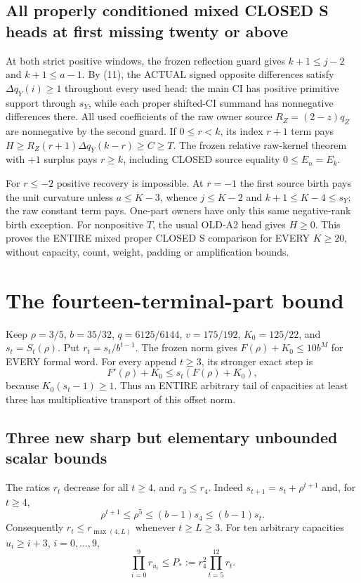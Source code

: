 \documentclass[11pt]{article}
\begin{document}
\subsection{All properly conditioned mixed CLOSED S heads at first missing twenty or above}
At both strict positive windows, the frozen reflection guard gives
$k+1\le j-2$ and $k+1\le a-1$. By (11), the ACTUAL signed opposite
differences satisfy $\Delta q_Y(i)\ge1$ throughout every used head:
the main CI has positive primitive support through $s_Y$, while each
proper shifted-CI summand has nonnegative differences there.
All used coefficients of the raw owner source $R_Z=(2-z)q_Z$ are
nonnegative by the second guard. If $0\le r<k$, its index $r+1$ term
pays $H\ge R_Z(r+1)\Delta q_Y(k-r)\ge C\ge T$.
The frozen relative raw-kernel theorem with $+1$ surplus pays $r\ge k$,
including CLOSED source equality $0\le E_n=E_k$.

For $r\le-2$ positive recovery is impossible. At $r=-1$ the first
source birth pays the unit curvature unless $a\le K-3$, whence
$j\le K-2$ and $k+1\le K-4\le s_Y$; the raw constant term pays.
One-part owners have only this same negative-rank birth exception.
For nonpositive $T$, the usual OLD-A2 head gives $H\ge0$.
This proves the ENTIRE mixed proper CLOSED S comparison for EVERY
$K\ge20$, without capacity, count, weight, padding or amplification bounds.

\section{The fourteen-terminal-part bound}

\par\medskip


Keep $\rho=3/5$, $b=35/32$, $q=6125/6144$, $v=175/192$,
$K_0=125/22$, and $s_t=S_t(\rho)$. Put $r_t=s_t/b^{t-1}$.
The frozen norm gives $F(\rho)+K_0\le10b^M$ for EVERY formal word.
For every append $t\ge3$, its stronger exact step is
\[
       F'(\rho)+K_0\le s_t(F(\rho)+K_0),              \tag{1}
\]
because $K_0(s_t-1)\ge1$. Thus an ENTIRE arbitrary tail of capacities
at least three has multiplicative transport of this offset norm.

\subsection{Three new sharp but elementary unbounded scalar bounds}
The ratios $r_t$ decrease for all $t\ge4$, and $r_3\le r_4$.
Indeed $s_{t+1}=s_t+\rho^{t+1}$ and, for $t\ge4$,
\[
 \rho^{t+1}\le\rho^5\le(b-1)s_4\le(b-1)s_t.
\]
Consequently $r_t\le r_{\max(4,L)}$ whenever $t\ge L\ge3$.
For ten arbitrary capacities $u_i\ge i+3$, $i=0,\ldots,9$,
\[
 \prod_{i=0}^9r_{u_i}\le P_*:=r_4^2\prod_{t=5}^{12}r_t.        \tag{2}
\]
\end{document}
